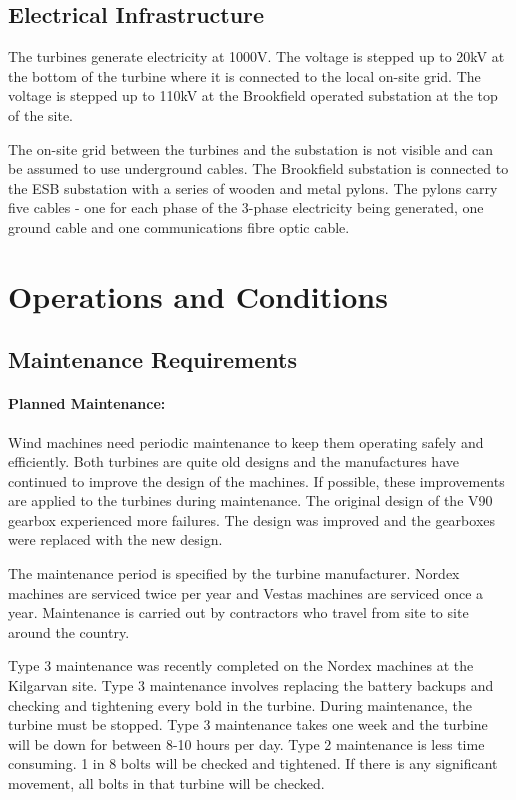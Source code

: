 \documentclass[12pt]{article} %
\begin{document}
\subsection{Electrical Infrastructure}
The turbines generate electricity at 1000V. The voltage is stepped up to 20kV at the bottom of the turbine where it is connected to the local on-site grid. The voltage is stepped up to 110kV at the Brookfield operated substation at the top of the site.

The on-site grid between the turbines and the substation is not visible and can be assumed to use underground cables.
The Brookfield substation is connected to the ESB substation with a series of wooden and metal pylons. The pylons carry five cables - one for each phase of the 3-phase electricity being generated, one ground cable and one communications fibre optic cable.

\section{Operations and Conditions}

\subsection{Maintenance Requirements}
\paragraph{Planned Maintenance:}
Wind machines need periodic maintenance to keep them operating safely and efficiently. 
Both turbines are quite old designs and the manufactures have continued to improve the design of the machines. If possible, these improvements are applied to the turbines during maintenance.
The original design of the V90 gearbox experienced more failures. The design was improved and the gearboxes were replaced with the new design.

The maintenance period is specified by the turbine manufacturer.
Nordex machines are serviced twice per year and Vestas machines are serviced once a year. 
Maintenance is carried out by contractors who travel from site to site around the country.

Type 3 maintenance was recently completed on the Nordex machines at the Kilgarvan site. Type 3 maintenance involves replacing the battery backups and checking and tightening every bold in the turbine. During maintenance, the turbine must be stopped. Type 3 maintenance takes one week and the turbine will be down for between 8-10 hours per day.
Type 2 maintenance is less time consuming. 1 in 8 bolts will be checked and tightened. If there is any significant movement, all bolts in that turbine will be checked.
\end{document}
